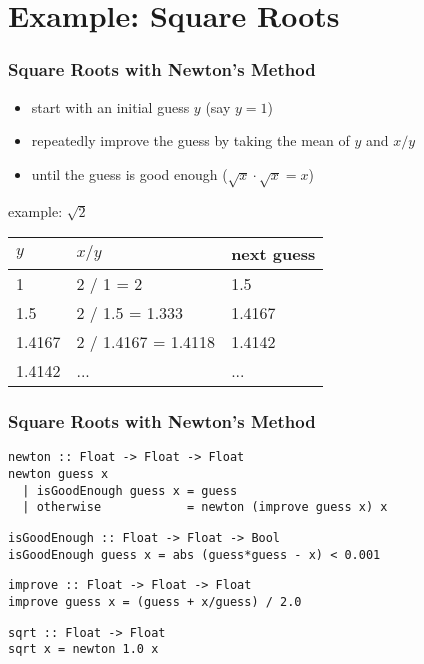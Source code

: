\documentclass[dvipsnames]{beamer}
\theoremstyle{plain}
\begin{document}
\section{Example: Square Roots}

\lstset{deletekeywords=sqrt}

\begin{frame}
  \frametitle{Square Roots with Newton's Method}

  \begin{itemize}
    \item start with an initial guess $y$ (say $y = 1$)
    \item repeatedly improve the guess by taking the mean of $y$
      and $x / y$
    \item until the guess is good enough ($\sqrt x \cdot \sqrt x = x$)
  \end{itemize}

  \medskip
  \begin{exampleblock}{example: $\sqrt{2}$}
    \begin{center}
      \begin{tabular}{lll}
      $y$      & $x / y$             & next guess\\\hline
      1        & 2 / 1 = 2           & 1.5\\
      1.5      & 2 / 1.5 = 1.333     & 1.4167\\
      1.4167   & 2 / 1.4167 = 1.4118 & 1.4142\\
      1.4142   & ...                 & ...
      \end{tabular}
    \end{center}
  \end{exampleblock}
\end{frame}

\begin{frame}[fragile]
  \frametitle{Square Roots with Newton's Method}

  \begin{lstlisting}
newton :: Float -> Float -> Float
newton guess x
  | isGoodEnough guess x = guess
  | otherwise            = newton (improve guess x) x
  \end{lstlisting}

  \pause
  \begin{lstlisting}
isGoodEnough :: Float -> Float -> Bool
isGoodEnough guess x = abs (guess*guess - x) < 0.001
  \end{lstlisting}

  \pause
  \begin{lstlisting}
improve :: Float -> Float -> Float
improve guess x = (guess + x/guess) / 2.0
  \end{lstlisting}

  \pause
  \begin{lstlisting}
sqrt :: Float -> Float
sqrt x = newton 1.0 x
  \end{lstlisting}
\end{frame}
\end{document}
